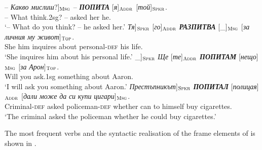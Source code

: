 \documentclass[output=paper,colorlinks,citecolor=brown]{langscibook}
\begin{document}
\begin{exe}
\ex \label{ex:07questionbg}
\begin{xlist}
\ex \label{ex:07questionbg:a}
\gll {[}-- \textit{Какво} \textit{мислиш}?{]}$_{\text{\textsc{Msg}}}$  -- \textit{\textbf{ПОПИТА}} [\textit{я}]$_{\text{\textsc{Addr}}}$  [\textit{той}]$_{\text{\textsc{Spkr}}}$.\\
-- What think.2sg? -- asked her he.
 \\
 \glt `-- What do you think? -- he asked her.'
\ex \label{ex:07questionbg:b}
 \gll  {[}\textit{Тя}{]}$_{\text{\textsc{Spkr}}}$  [\textit{го}]$_{\text{\textsc{Addr}}}$  \textit{\textbf{РАЗПИТВА}} [\_]$_{\text{\textsc{Msg}}}$   [\textit{за} \textit{личния} \textit{му} \textit{живот}]$_{\text{\textsc{Top}}}$.\\
  She him inquires {} about personal-\textsc{def}  his life.
  \\
 \glt `She inquires him about his personal life.'
\ex \label{ex:07questionbg:c}
\gll {[}\_{]}$_{\text{\textsc{Spkr}}}$  \textit{Ще} [\textit{те}]$_{\text{\textsc{Addr}}}$  \textit{\textbf{ПОПИТАМ}} [\textit{нещо}]$_{\text{\textsc{Msg}}}$   [\textit{за} \textit{Арон}]$_{\text{\textsc{Top}}}$.\\
{}  Will you ask.1sg something about Aaron.
 \\
 \glt `I will ask you something about Aaron.'
\ex \label{ex:07questionbg:d}
\gll {[}\textit{Престъпникът}{]}$_{\text{\textsc{Spkr}}}$  \textit{\textbf{ПОПИТАЛ}} [\textit{полицая}]$_{\text{\textsc{Addr}}}$  [\textit{дали} \textit{може} \textit{да} \textit{си} \textit{купи} \textit{цигари}]$_{\text{\textsc{Msg}}}$.
 \\
 Criminal-\textsc{def} asked policeman-\textsc{def} whether can to  himself buy cigarettes.
 \\
 \glt `The criminal asked the policeman whether he could buy cigarettes.'
\end{xlist}
\end{exe}

The most frequent verbs and the syntactic realisation of the  frame elements of  is shown in .
\end{document}
